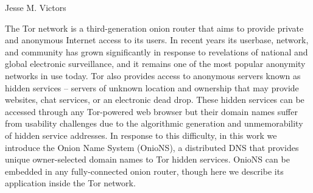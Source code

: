 \begin{publicabstract}
\centerline{Jesse M. Victors}
\vspace{12pt}

The Tor network is a third-generation onion router that aims to provide private and anonymous Internet access to its users. In recent years its userbase, network, and community has grown significantly in response to revelations of national and global electronic surveillance, and it remains one of the most popular anonymity networks in use today. Tor also provides access to anonymous servers known as hidden services -- servers of unknown location and ownership that may provide websites, chat services, or an electronic dead drop. These hidden services can be accessed through any Tor-powered web browser but their domain names suffer from usability challenges due to the algorithmic generation and unmemorability of hidden service addresses. In response to this difficulty, in this work we introduce the Onion Name System (OnioNS), a distributed DNS that provides unique owner-selected domain names to Tor hidden services. OnioNS can be embedded in any fully-connected onion router, though here we describe its application inside the Tor network.

\end{publicabstract}

